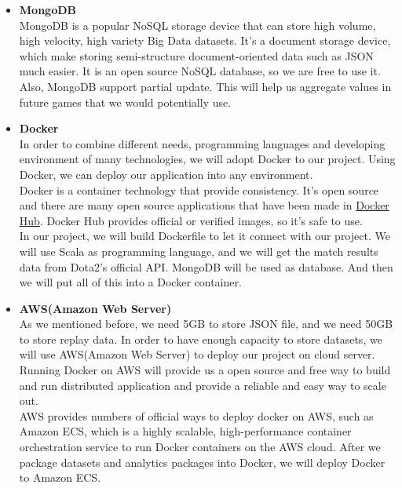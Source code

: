 \documentclass{article}
\begin{document}
\begin{itemize}
\item \textbf{MongoDB}\\
MongoDB is a popular NoSQL storage device that can store high volume, high velocity, high variety Big Data datasets. It's a document storage device, which make storing semi-structure document-oriented data such as JSON much easier. It is an open source NoSQL database, so we are free to use it.\\

Also, MongoDB support partial update. This will help us aggregate values in future games that we would potentially use.\\

\item \textbf{Docker}\\
In order to combine different needs, programming languages and developing environment of many technologies, we will adopt Docker to our project. Using Docker, we can deploy our application into any environment.\\

Docker is a container technology that provide consistency. It's open source and there are many open source applications that have been made in \href{https://hub.docker.com}{Docker Hub}. Docker Hub provides official or verified images, so it's safe to use.\\

In our project, we will build Dockerfile to let it connect with our project. We will use Scala as programming language, and we will get the match results data from Dota2’s official API. MongoDB will be used as database. And then we will put all of this into a Docker container.\\

\item \textbf{AWS(Amazon Web Server)}\\
As we mentioned before, we need 5GB to store JSON file, and we need 50GB to store replay data. In order to have enough capacity to store datasets, we will use AWS(Amazon Web Server) to deploy our project on cloud server. Running Docker on AWS will provide us a open source and free way to build and run distributed application and provide a reliable and easy way to scale out.\\

AWS provides numbers of official ways to deploy docker on AWS, such as Amazon ECS, which is a highly scalable, high-performance container orchestration service to run Docker containers on the AWS cloud. After we package datasets and analytics packages into Docker, we will deploy Docker to Amazon ECS.\\
\end{itemize}





\end{document}

